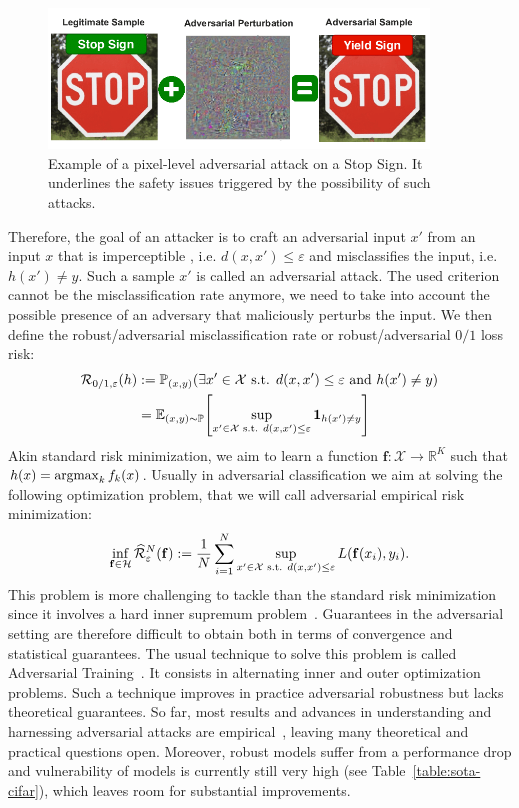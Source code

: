\begin{figure}
    \centering
    \includegraphics[width=0.9\textwidth]{Images/adv_image.png}
    \caption{Example of a pixel-level adversarial attack on a Stop Sign. It underlines the safety issues triggered by the possibility of such attacks.}
    \label{fig:adv-example}
\end{figure}

Therefore, the goal of an attacker is to craft an adversarial input $x'$ from an input $x$ that is imperceptible , i.e. $d(x,x')\leq \varepsilon$ and misclassifies the input, i.e. $h(x')\neq y$. Such a sample $x'$ is called an adversarial attack. The used criterion cannot be the misclassification rate anymore, we need to take into account the possible presence of an adversary that maliciously perturbs the input. We then define the robust/adversarial misclassification rate or robust/adversarial $0/1$ loss risk: 
\begin{align*}
\risk_{0/1,\varepsilon}(h)&:=\PP_{(x,y)}(\exists x'\in\XX\text{ s.t. } d(x,x')\leq \varepsilon \text{ and } h(x')\neq y)\\
&= \EE_{(x,y)\sim\PP}\left[\sup_{x'\in\XX\text{ s.t. } d(x,x')\leq \varepsilon}\mathbf{1}_{h(x')\neq y}\right]
\end{align*}
Akin standard risk minimization, we aim to learn a function $\mathbf{f}:\mathcal{X}\to\mathbb{R}^K$ such that $h(x)=\operatorname*{argmax}_k f_k(x)$. Usually in adversarial classification we aim at solving the following optimization problem, that we will call adversarial empirical risk minimization:
\begin{align*}
\inf_{\mathbf{f}\in\mathcal{H}}\widehat{\mathcal{R}}_\varepsilon^{N}(\mathbf{f}):= \frac{1}{N}\sum_{i=1}^N\sup_{x'\in\mathcal{X}\text{ s.t. } d(x,x')\leq \varepsilon} L(\mathbf{f}(x_i),y_i).
\end{align*}
This problem is more challenging to tackle than the standard risk minimization  since it involves a hard inner supremum problem~\citep{madry2018towards}. Guarantees in the adversarial setting are therefore difficult to obtain both in terms of convergence and statistical guarantees. The usual technique to solve this problem is called Adversarial Training~\citep{goodfellow2014explaining,madry2018towards}. It consists in alternating inner and outer optimization problems. Such a technique improves in practice adversarial robustness but lacks theoretical guarantees. So far, most results and advances in understanding and harnessing adversarial attacks are empirical~\citep{ilyas2019adversarial,rice2020overfitting}, leaving many theoretical and practical questions open.  Moreover, robust models suffer from a performance drop and vulnerability of models is currently still very high (see Table~\ref{table:sota-cifar}), which leaves room for substantial improvements.

